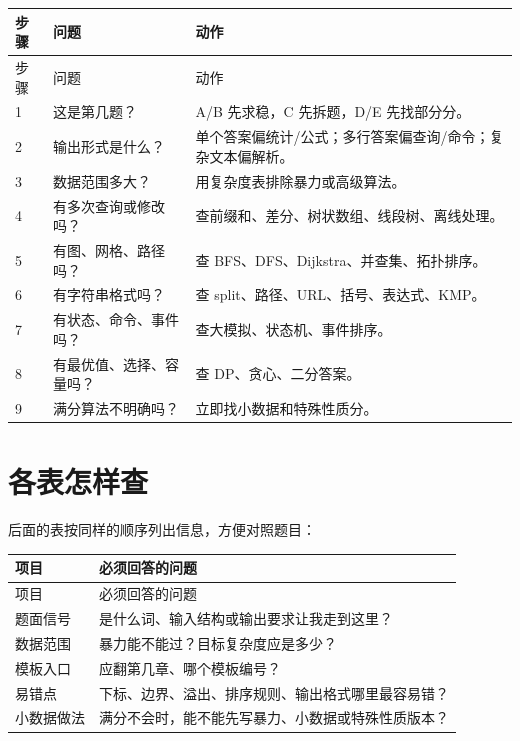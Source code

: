 \begin{longtable}{p{2.6cm}p{6.2cm}p{5.8cm}}
\toprule
步骤 & 问题 & 动作 \\
\midrule
\endfirsthead
\toprule
步骤 & 问题 & 动作 \\
\midrule
\endhead
1 & 这是第几题？ & A/B 先求稳，C 先拆题，D/E 先找部分分。 \\
2 & 输出形式是什么？ & 单个答案偏统计/公式；多行答案偏查询/命令；复杂文本偏解析。 \\
3 & 数据范围多大？ & 用复杂度表排除暴力或高级算法。 \\
4 & 有多次查询或修改吗？ & 查前缀和、差分、树状数组、线段树、离线处理。 \\
5 & 有图、网格、路径吗？ & 查 BFS、DFS、Dijkstra、并查集、拓扑排序。 \\
6 & 有字符串格式吗？ & 查 split、路径、URL、括号、表达式、KMP。 \\
7 & 有状态、命令、事件吗？ & 查大模拟、状态机、事件排序。 \\
8 & 有最优值、选择、容量吗？ & 查 DP、贪心、二分答案。 \\
9 & 满分算法不明确吗？ & 立即找小数据和特殊性质分。 \\
\bottomrule
\end{longtable}

\section{各表怎样查}\label{sec:03-4}

后面的表按同样的顺序列出信息，方便对照题目：

\begin{longtable}{p{2.8cm}p{11.2cm}}
\toprule
项目 & 必须回答的问题 \\
\midrule
\endfirsthead
\toprule
项目 & 必须回答的问题 \\
\midrule
\endhead
题面信号 & 是什么词、输入结构或输出要求让我走到这里？ \\
数据范围 & 暴力能不能过？目标复杂度应是多少？ \\
模板入口 & 应翻第几章、哪个模板编号？ \\
易错点 & 下标、边界、溢出、排序规则、输出格式哪里最容易错？ \\
小数据做法 & 满分不会时，能不能先写暴力、小数据或特殊性质版本？ \\
\bottomrule
\end{longtable}


